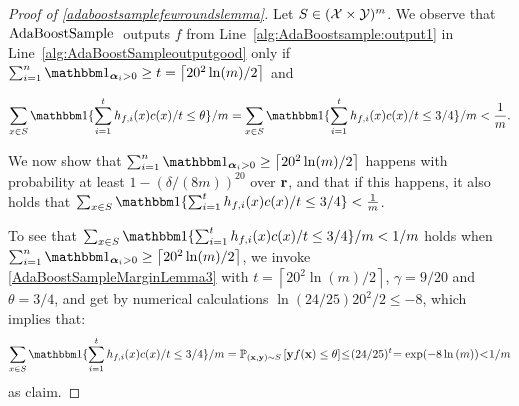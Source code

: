 \begin{proof}[Proof of \cref{adaboostsamplefewroundslemma}]
    
Let $S\in (\mathcal{X}\times \mathcal{Y})^{m}$. We observe that $\text{AdaBoostSample }$ outputs $f$ from Line~\ref{alg:AdaBoostsample:output1} in Line~\ref{alg:AdaBoostSampleoutputgood} only if 
$\sum_{i=1}^{n} \ind_{\alphar_i>0} \geq t= \left\lceil 20^{2}\ln(m)/2 \right\rceil$ and 

\begin{align*}
    \sum_{x\in S} \ind\{\sum_{i=1}^{t} h_{f,i}(x)c(x)/t\leq \theta \}/m = \sum_{x\in S} \ind\{\sum_{i=1}^{t} h_{f,i}(x)c(x)/t\leq 3/4 \}/m < \frac{1}{m}.
\end{align*}

We now show that $\sum_{i=1}^{n} \ind_{\alphar_i>0} \geq \left\lceil20^{2}\ln(m)/2\right\rceil$ happens with probability at least $1-(\delta/(8m))^{20}$ over $\mathbf{r}$, and that if this happens, it also holds that $\sum_{x\in S}  
                \ind\{\sum_{i=1}^{t} h_{f,i}(x)c(x)/t\leq 3/4\} < \frac{1}{m}$.

To see that $\sum_{x\in S} \ind\{\sum_{i=1}^{t} h_{f,i}(x)c(x)/t\leq 3/4 \}/m < 1/m$ holds when $\sum_{i=1}^{n} \ind_{\alphar_i>0} \geq \left\lceil 20^{2}\ln(m)/2 \right\rceil$, we invoke \cref{AdaBoostSampleMarginLemma3} with $t=\left\lceil 20^{2}\ln(m)/2 \right\rceil$,  $\gamma=9/20$ and $\theta=3/4$, and get by numerical calculations $ \ln{(24/25 )} 20^{2}/2\leq-8$, which implies that:
\begin{align*}
    \sum_{x\in S} \ind\{\sum_{i=1}^{t} h_{f,i}(x)c(x)/t\leq 3/4 \}/m =\p_{(\rx,\ry)\sim S}\left[\ry f(\rx)\leq \theta \right]\negmedspace\leq \negmedspace(24/25)^{t}\negmedspace=\exp(-8\ln{(m )})\negmedspace<\negmedspace1/m
\end{align*}  
as claim.


\end{proof}

